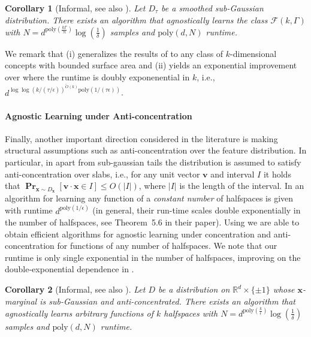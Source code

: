 \documentclass[10pt,a4paper]{article}
\newtheorem{corollary}{Corollary}[section]
\renewcommand\vec[1]{\mathbf{#1}}
\DeclareMathOperator*{\pr}{\mathbf{Pr}}
\newcommand{\R}{\mathbb{R}}
\newcommand{\eps}{\epsilon}
\newcommand{\poly}{\mathrm{poly}}
\newcommand{\1}{\Ind}
\newcommand{\wt}{\widetilde}
\newcommand{\x}{\vec x}
\begin{document}
\begin{corollary}[Informal, see also ]
\label{intro-cor:smoothed-distributions}
Let $D_\tau$ be a smoothed sub-Gaussian distribution.   
There exists an algorithm that agnostically learns the class $\mathcal F(k, \Gamma)$ 
with $N = d^{\poly(\frac{k\Gamma}{\tau \epsilon})}\log(\frac{1}{\delta})$ samples and $\poly(d,N)$ runtime.
\end{corollary}

We remark that  (i) generalizes the results of 
\cite{Kane2013LearningHalfspacesLogConcave} to any class of $k$-dimensional concepts with bounded surface area and (ii) yields an exponential improvement over \cite{Kane2013LearningHalfspacesLogConcave} where the runtime is doubly exponenential in $k$, i.e., $d^{\log \log(k/(\tau/\eps))^{\wt{O}(k)} \poly(1/(\tau \eps))}$. 


\paragraph{Agnostic Learning under Anti-concentration}
Finally, another important direction considered in the literature is making structural
assumptions such as anti-concentration over the feature distribution.
In particular, in \cite{gollakota_testable} apart from sub-gaussian tails the distribution
is assumed to satisfy anti-concentration over slabs, i.e., for any unit vector $\vec v$ and interval $I$ it holds that $\pr_{\x \sim D_\x}[\vec v \cdot \x \in I] \leq O(|I|)$, where $|I|$
is the length of the interval.  In \cite{gollakota_testable} an algorithm for learning
any function of a \emph{constant number} of halfspaces is given with runtime $d^{\poly(1/\eps)}$ (in general, their run-time scales double exponentially in the number of halfspaces, see Theorem~5.6 in their paper).
Using  we are able to obtain efficient algorithms for agnostic learning under concentration and anti-concentration for functions of any number of halfspaces. We note that our runtime is only single exponential in the number of halfspaces, improving on the double-exponential dependence in \cite{gollakota_testable}. 

\begin{corollary}[Informal, see also ]
Let $D$ be a distribution on $\R^d \times \{\pm 1\}$ whose $\x$-marginal is sub-Gaussian
and anti-concentrated.
There exists an algorithm that agnostically learns arbitrary functions of $k$ halfspaces
 with $N = d^{\poly(\frac{k}{\epsilon})}\log(\frac{1}{\delta})$ samples and $\poly(d,N)$ runtime.
\end{corollary}
\end{document}
